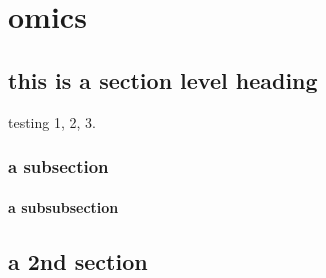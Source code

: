 \chapter{omics}

\section{this is a section level heading}
testing 1, 2, 3.

\subsection{a subsection}

\subsubsection{a subsubsection}

\section{a 2nd section}



